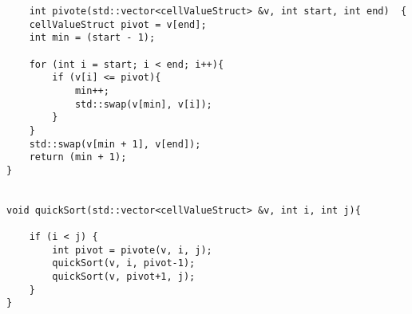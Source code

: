 \begin{lstlisting}
    int pivote(std::vector<cellValueStruct> &v, int start, int end)  {  
    cellValueStruct pivot = v[end]; 
    int min = (start - 1);  
  
    for (int i = start; i < end; i++){  
        if (v[i] <= pivot){  
            min++; 
            std::swap(v[min], v[i]);  
        }  
    }  
    std::swap(v[min + 1], v[end]);  
    return (min + 1);  
}  


void quickSort(std::vector<cellValueStruct> &v, int i, int j){

    if (i < j) {
        int pivot = pivote(v, i, j);
        quickSort(v, i, pivot-1);
        quickSort(v, pivot+1, j);
    }
}

\end{lstlisting}
